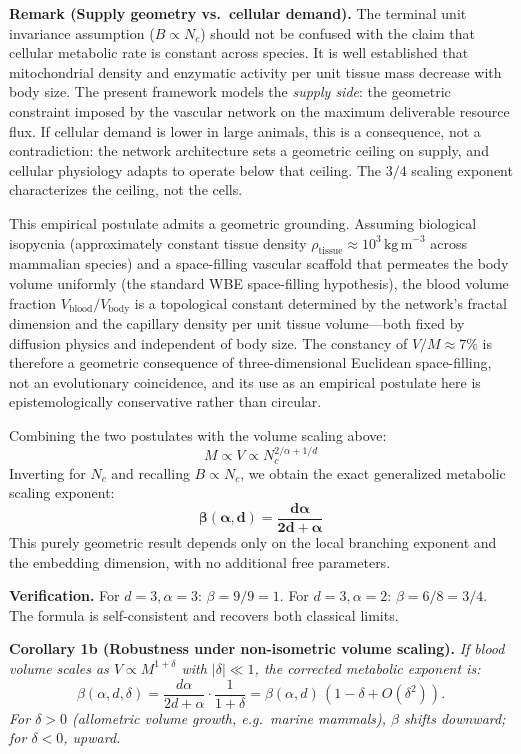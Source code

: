 \documentclass[11pt,a4paper]{article}
\theoremstyle{remark}
\begin{document}
\noindent\textbf{Remark (Supply geometry vs.\ cellular demand).} The terminal unit invariance assumption ($B \propto N_c$) should not be confused with the claim that cellular metabolic rate is constant across species. It is well established that mitochondrial density and enzymatic activity per unit tissue mass decrease with body size. The present framework models the \emph{supply side}: the geometric constraint imposed by the vascular network on the maximum deliverable resource flux. If cellular demand is lower in large animals, this is a consequence, not a contradiction: the network architecture sets a geometric ceiling on supply, and cellular physiology adapts to operate below that ceiling. The $3/4$ scaling exponent characterizes the ceiling, not the cells.

This empirical postulate admits a geometric grounding. Assuming
biological isopycnia (approximately constant tissue density
$\rho_{\mathrm{tissue}} \approx 10^3\,\mathrm{kg\,m}^{-3}$ across
mammalian species) and a space-filling vascular scaffold that
permeates the body volume uniformly (the standard WBE space-filling
hypothesis), the blood volume fraction $V_{\mathrm{blood}}/V_{\mathrm{body}}$
is a topological constant determined by the network's fractal
dimension and the capillary density per unit tissue volume---both
fixed by diffusion physics and independent of body size. The
constancy of $V/M \approx 7\%$ is therefore a geometric consequence
of three-dimensional Euclidean space-filling, not an evolutionary
coincidence, and its use as an empirical postulate here is
epistemologically conservative rather than circular.

Combining the two postulates with the volume scaling above:
\begin{equation}
M \propto V \propto N_c^{2/\alpha + 1/d}
\end{equation}
Inverting for $N_c$ and recalling $B \propto N_c$, we obtain the exact
generalized metabolic scaling exponent:
\begin{equation}
\boldsymbol{\beta(\alpha, d) = \frac{d\alpha}{2d + \alpha}}
\end{equation}
This purely geometric result depends only on the local branching exponent and
the embedding dimension, with no additional free parameters.

\noindent\textbf{Verification.} For $d=3, \alpha=3$: $\beta=9/9=1$. For $d=3, \alpha=2$: $\beta=6/8=3/4$. The formula is self-consistent and recovers both classical limits.

\vspace{0.4em}
\noindent\textbf{Corollary 1b (Robustness under non-isometric volume scaling).} \textit{If blood volume scales as $V \propto M^{1+\delta}$ with $|\delta| \ll 1$, the corrected metabolic exponent is:}
\begin{equation}
\beta(\alpha, d, \delta) = \frac{d\alpha}{2d+\alpha}\cdot\frac{1}{1+\delta} = \beta(\alpha,d)\,(1 - \delta + O(\delta^2)).
\end{equation}
\textit{For $\delta > 0$ (allometric volume growth, e.g.\ marine mammals), $\beta$ shifts downward; for $\delta < 0$, upward.}
\end{document}
